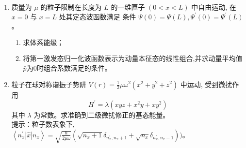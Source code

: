

\begin{enumerate}
	\item
	质量为 $\mu$ 的粒子限制在长度为 $L$ 的一维匣子 $(0<x<L)$ 中自由运动, 在 $x=0$ 与 $x=L$ 处其定态波函数满足 条件 $\Psi(0)=\Psi(L),  \Psi^{\prime}(0)=\Psi^{\prime}(L)$。
	\begin{enumerate}
		\item
		求体系能级；
		\item
		将第一激发态归一化波函数表示为动量本征态的线性组合,并求动量平均值$ \bar{p} $为$ 0 $时组合系数满足的条件。
		
		
		
		
	\end{enumerate}
	

\item 
粒子在球对称谐振子势阱 $V(r)=\frac{1}{2} \mu \omega^{2}\left(x^{2}+y^{2}+z^{2}\right)$ 中运动, 受到微扰作用
\[ 
H^{\prime}=\lambda\left(x y z+x^{2} y+x y^{2}\right)
 \]
其中 $\lambda$ 为常数。求准确到二级微扰修正的基态能量。\\
提示：粒子数表象下, $ \left\langle n_{x}^{\prime}|\hat{x}| n_{x}\right\rangle=\sqrt{\frac{\hbar}{2 \mu \omega}}\left(\sqrt{n_{x}+1} \delta_{n_{x}^{\prime}, n_{x}+1}+\sqrt{n_{x}} \delta_{n_{x}^{\prime}, n_{x}-1}\right) )$。
	

\end{enumerate}

